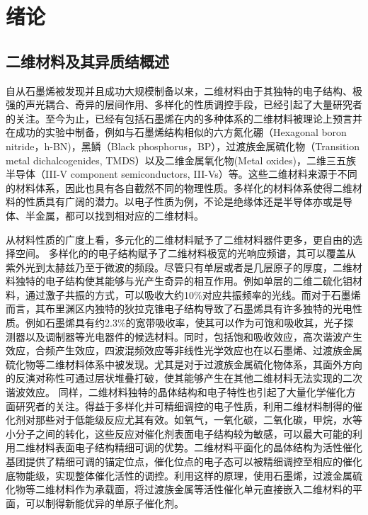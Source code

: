 \chapter{绪\hspace{6pt}论}

\section{二维材料及其异质结概述}
自从石墨烯被发现并且成功大规模制备以来，二维材料由于其独特的电子结构、极强的声光耦合、奇异的层间作用、多样化的性质调控手段，已经引起了大量研究者的关注。至今为止，已经有包括石墨烯在内的多种体系的二维材料被理论上预言并在成功的实验中制备，例如与石墨烯结构相似的六方氮化硼（Hexagonal boron nitride，h-BN)，黑鳞（Black phosphorus，BP），过渡族金属硫化物（Transition metal dichalcogenides, TMDS）以及二维金属氧化物(Metal oxides)，二维三五族半导体（III-V component semiconductors, III-Vs）等。这些二维材料来源于不同的材料体系，因此也具有各自截然不同的物理性质。多样化的材料体系使得二维材料的性质具有广阔的潜力。以电子性质为例，不论是绝缘体还是半导体亦或是导体、半金属，都可以找到相对应的二维材料。

从材料性质的广度上看，多元化的二维材料赋予了二维材料器件更多，更自由的选择空间。
多样化的的电子结构赋予了二维材料极宽的光响应频谱，其可以覆盖从紫外光到太赫兹乃至于微波的频段。尽管只有单层或者是几层原子的厚度，二维材料独特的电子结构使其能够与光产生奇异的相互作用。例如单层的二维二硫化钼材料，通过激子共振的方式，可以吸收大约10\%对应共振频率的光线。而对于石墨烯而言，其布里渊区内独特的狄拉克锥电子结构导致了石墨烯具有许多独特的光电性质。例如石墨烯具有约2.3\%的宽带吸收率，使其可以作为可饱和吸收其，光子探测器以及调制器等光电器件的候选材料。同时，包括饱和吸收效应，高次谐波产生效应，合频产生效应，四波混频效应等非线性光学效应也在以石墨烯、过渡族金属硫化物等二维材料体系中被发现。尤其是对于过渡族金属硫化物体系，其面外方向的反演对称性可通过层状堆叠打破，使其能够产生在其他二维材料无法实现的二次谐波效应。
同样，二维材料独特的晶体结构和电子特性也引起了大量化学催化方面研究者的关注。得益于多样化并可精细调控的电子性质，利用二维材料制得的催化剂对那些对于低能级反应尤其有效。如氧气，一氧化碳，二氧化碳，甲烷，水等小分子之间的转化，这些反应对催化剂表面电子结构较为敏感，可以最大可能的利用二维材料表面电子结构精细可调的优势。二维材料平面化的晶体结构为活性催化基团提供了精细可调的锚定位点，催化位点的电子态可以被精细调控至相应的催化底物能级，实现整体催化活性的调控。利用这样的原理，使用石墨烯，过渡金属硫化物等二维材料作为承载面，将过渡族金属等活性催化单元直接嵌入二维材料的平面，可以制得新能优异的单原子催化剂。

